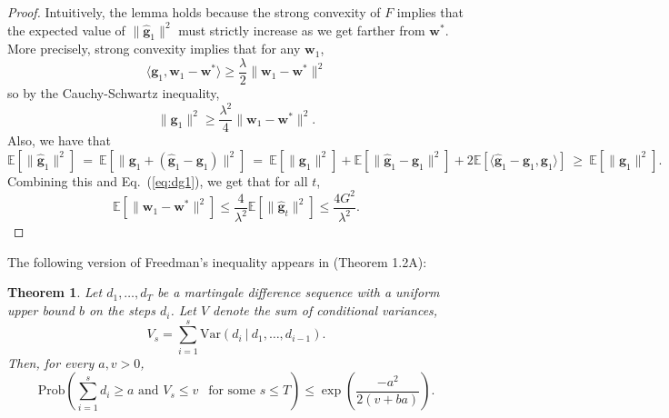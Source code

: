 \documentclass{article}
\newtheorem{theorem}{Theorem}
\newcommand{\E}{\mathbb{E}}
\newcommand{\var}{\text{Var}}
\newcommand{\Prob}[1]{{\mathrm{Prob} \left(#1\right)}}
\newcommand{\bw}{\mathbf{w}}
\newcommand{\bg}{\mathbf{g}}
\newcommand{\norm}[1]{\|#1\|}
\newcommand{\inner}[1]{\langle#1\rangle}
\renewcommand{\eqref}[1]{Eq.~(\ref{#1})}
\begin{document}
\begin{proof}
Intuitively, the lemma holds because the strong convexity of $F$ implies that the expected value of $\norm{\hat{\bg}_1}^2$ must strictly increase as we get farther from $\bw^{*}$. More precisely, strong convexity implies that for any $\bw_1$,
\[
\inner{\bg_1,\bw_1-\bw^{*}} \geq \frac{\lambda}{2}\norm{\bw_1-\bw^{*}}^2
\]
so by the Cauchy-Schwartz inequality,
\begin{equation}\label{eq:dg1}
\norm{\bg_1}^2\geq \frac{\lambda^2}{4}\norm{\bw_1-\bw^{*}}^2.
\end{equation}
Also, we have that
\[
\E[\norm{\hat{\bg}_1}^2] ~=~ \E[\norm{\bg_1+(\hat{\bg}_1-\bg_1)}^2]
~=~ \E[\norm{\bg_1}^2]+\E[\norm{\hat{\bg}_1-\bg_1}^2]
+2\E[\inner{\hat{\bg}_1-\bg_1,\bg_1}]~\geq~
\E[\norm{\bg_1}^2].
\]
Combining this and \eqref{eq:dg1}, we get that for all $t$,
\[
\E[\norm{\bw_1-\bw^*}^2] \leq \frac{4}{\lambda^2}\E[\norm{\hat{\bg}_t}^2] \leq \frac{4G^2}{\lambda^2}.
\]
\end{proof}




The following version of Freedman's inequality appears in \cite{de1999general} (Theorem 1.2A):
\begin{theorem}\label{thm:Freedman-uniform}
Let $d_1, \dots, d_T$ be a martingale difference sequence with a uniform upper bound $b$ on the steps $d_i$.
Let $V$ denote the sum of conditional variances,
\[
V_s = \sum_{i=1}^s \var(d_i ~|~ d_1, \dots, d_{i-1}).
\]
Then, for every $a,v > 0$,
\[
\Prob{\sum_{i=1}^s d_i \ge a \mbox{ and } V_s \le v ~~\mbox{ for some } s\leq T} \le \exp
\left(\frac{-a^2}{2(v + ba)}\right).
\]
\end{theorem}
\end{document}
